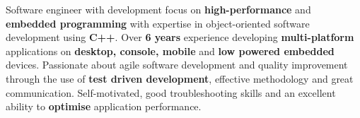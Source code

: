 
\begin{cvparagraph}

Software engineer with development focus on \textbf{high-performance} and \textbf{embedded programming} with expertise in object-oriented
software development using \textbf{C++}. Over \textbf{6 years} experience developing \textbf{multi-platform} applications 
on \textbf{desktop, console, mobile} and \textbf{low powered embedded} devices. Passionate about agile software development and quality improvement
through the use of \textbf{test driven development}, effective methodology and great communication. Self-motivated,
good troubleshooting skills and an excellent ability to \textbf{optimise} application performance.

\end{cvparagraph}
